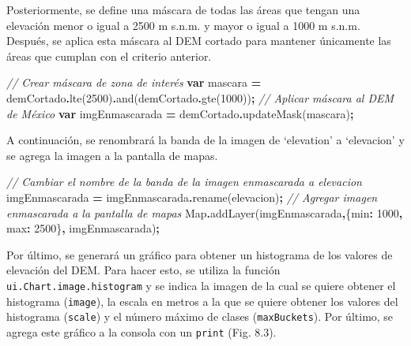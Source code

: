 \documentclass[
  12pt,
  letterpaper,
  twoside]{book}
\newenvironment{Shaded}{\begin{snugshade}}{\end{snugshade}}
\newcommand{\BuiltInTok}[1]{#1}
\newcommand{\CommentTok}[1]{\textcolor[rgb]{0.56,0.35,0.01}{\textit{#1}}}
\newcommand{\DataTypeTok}[1]{\textcolor[rgb]{0.13,0.29,0.53}{#1}}
\newcommand{\DecValTok}[1]{\textcolor[rgb]{0.00,0.00,0.81}{#1}}
\newcommand{\FunctionTok}[1]{\textcolor[rgb]{0.00,0.00,0.00}{#1}}
\newcommand{\KeywordTok}[1]{\textcolor[rgb]{0.13,0.29,0.53}{\textbf{#1}}}
\newcommand{\NormalTok}[1]{#1}
\newcommand{\OperatorTok}[1]{\textcolor[rgb]{0.81,0.36,0.00}{\textbf{#1}}}
\newcommand{\StringTok}[1]{\textcolor[rgb]{0.31,0.60,0.02}{#1}}
\begin{document}
Posteriormente, se define una máscara de todas las áreas que tengan una elevación menor o igual a 2500 m s.n.m. y mayor o igual a 1000 m s.n.m. Después, se aplica esta máscara al DEM cortado para mantener únicamente las áreas que cumplan con el criterio anterior.

\begin{Shaded}
\begin{Highlighting}[]
\CommentTok{// Crear máscara de zona de interés}
\KeywordTok{var}\NormalTok{ mascara }\OperatorTok{=}\NormalTok{ demCortado}\OperatorTok{.}\FunctionTok{lte}\NormalTok{(}\DecValTok{2500}\NormalTok{)}\OperatorTok{.}\FunctionTok{and}\NormalTok{(demCortado}\OperatorTok{.}\FunctionTok{gte}\NormalTok{(}\DecValTok{1000}\NormalTok{))}\OperatorTok{;}
\CommentTok{// Aplicar máscara al DEM de México}
\KeywordTok{var}\NormalTok{ imgEnmascarada }\OperatorTok{=}\NormalTok{ demCortado}\OperatorTok{.}\FunctionTok{updateMask}\NormalTok{(mascara)}\OperatorTok{;}
\end{Highlighting}
\end{Shaded}

A continuación, se renombrará la banda de la imagen de `elevation' a `elevacion' y se agrega la imagen a la pantalla de mapas.

\begin{Shaded}
\begin{Highlighting}[]
\CommentTok{// Cambiar el nombre de la banda de la imagen enmascarada a elevacion}
\NormalTok{imgEnmascarada }\OperatorTok{=}\NormalTok{ imgEnmascarada}\OperatorTok{.}\FunctionTok{rename}\NormalTok{(}\StringTok{\textquotesingle{}elevacion\textquotesingle{}}\NormalTok{)}\OperatorTok{;}
\CommentTok{// Agregar imagen enmascarada a la pantalla de mapas}
\BuiltInTok{Map}\OperatorTok{.}\FunctionTok{addLayer}\NormalTok{(imgEnmascarada}\OperatorTok{,}\NormalTok{\{}\DataTypeTok{min}\OperatorTok{:} \DecValTok{1000}\OperatorTok{,} \DataTypeTok{max}\OperatorTok{:} \DecValTok{2500}\NormalTok{\}}\OperatorTok{,} \StringTok{\textquotesingle{}imgEnmascarada\textquotesingle{}}\NormalTok{)}\OperatorTok{;}
\end{Highlighting}
\end{Shaded}

Por último, se generará un gráfico para obtener un histograma de los valores de elevación del DEM. Para hacer esto, se utiliza la función \texttt{ui.Chart.image.histogram} y se indica la imagen de la cual se quiere obtener el histograma (\texttt{image}), la escala en metros a la que se quiere obtener los valores del histograma (\texttt{scale}) y el número máximo de clases (\texttt{maxBuckets}). Por último, se agrega este gráfico a la consola con un \texttt{print} (Fig. 8.3).
\end{document}

